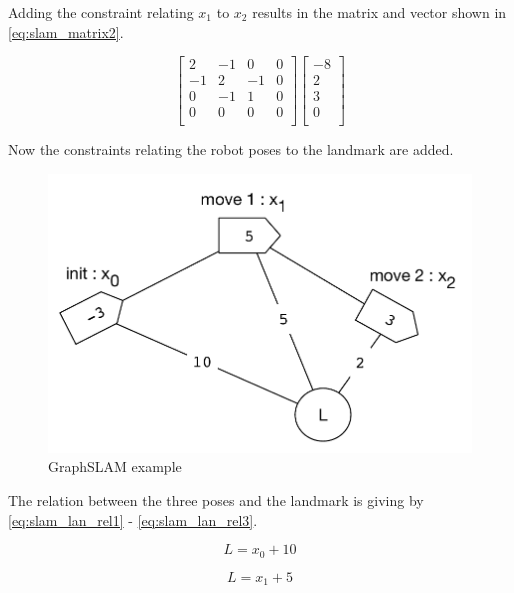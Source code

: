 Adding the constraint relating $x_1$ to $x_2$ results in the matrix and vector shown in \autoref{eq:slam_matrix2}.

\begin{equation}
\label{eq:slam_matrix2}
\begin{bmatrix}
2 & -1 & 0 & 0 \\
-1 & 2 & -1 & 0 \\
0 & -1 & 1 & 0 \\
0 & 0 & 0 & 0 \\
\end{bmatrix}
\begin{bmatrix}
-8 \\
2 \\
3 \\
0 \\
\end{bmatrix}
\end{equation}

Now the constraints relating the robot poses to the landmark are added.

\begin{figure}[H]
\centering
\includegraphics[scale=0.70]{images/ex_slam_graph}
\caption{GraphSLAM example}
\label{fig:slam_ex}
\end{figure}

The relation between the three poses and the landmark is giving by \autoref{eq:slam_lan_rel1} - \ref{eq:slam_lan_rel3}.

\begin{equation}
\label{eq:slam_lan_rel1}
L = x_0 + 10
\end{equation}

\begin{equation}
\label{eq:slam_lan_rel2}
L = x_1 + 5
\end{equation}

